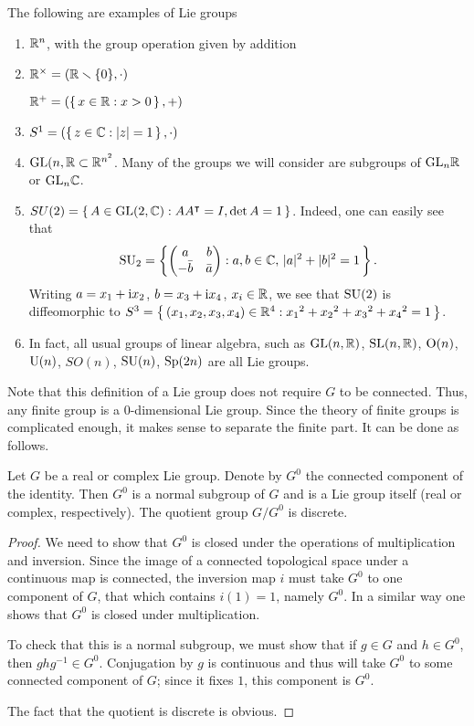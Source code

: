 \begin{example}
  The following are examples of Lie groups
  \begin{enumerate}[label=(\arabic*)]
  \item $\mathbb{R}^n$, with the group operation given by addition
  \item $\mathbb{R}^\times=(\mathbb{R}\smallsetminus\{0\},\cdot)$

    $\mathbb{R}^+=(\left\{\,x\in\mathbb{R}:x>0\,\right\},+)$
  \item $S^1=(\left\{\,z\in\mathbb{C}:|z|=1\,\right\},\cdot)$
  \item $\mathrm{GL}(n,\mathbb{R}\subset\mathbb{R}^{n^2}$. Many of the groups we will consider
    are subgroups of ${\mathrm{GL}_n}\mathbb{R}$ or ${\mathrm{GL}_n}\mathbb{C}$.
  \item $SU(2)=\left\{\,A\in\mathrm{GL}(2,\mathbb{C}):AA^\intercal=I,\det
      A=1\,\right\}$. Indeed, one can easily see that
    \[
      \mathrm{SU}_2=\left\{
        \begin{pmatrix}
          a&b\\
          -\bar b&\bar a
        \end{pmatrix}:
        a,b\in\mathbb{C},\,|a|^2+|b|^2=1\,
      \right\}.
    \]
    Writing $a=x_1+\mathrm{i} x_2$, $b=x_3+\mathrm{i} x_4$, $x_i\in\mathbb{R}$, we see that
    $\mathrm{SU}(2)$ is diffeomorphic to
    $S^3=\left\{\,(x_1,x_2,x_3,x_4)\in\mathbb{R}^4:{x_1}^2+{x_2}^2+{x_3}^2+{x_4}^2=1\,\right\}$.
  \item In fact, all usual groups of linear algebra, such as $\mathrm{GL}(n,\mathbb{R})$,
    $\mathrm{SL}(n,\mathbb{R})$, $\mathrm{O}(n)$, $\mathrm{U}(n)$, $SO(n)$, $\mathrm{SU}(n)$, $\mathrm{Sp}(2n)$ are
    all Lie groups.
  \end{enumerate}
\end{example}

Note that this definition of a Lie group does not require $G$ to be
connected. Thus, any finite group is a $0$-dimensional Lie group. Since the
theory of finite groups is complicated enough, it makes sense to separate
the finite part. It can be done as follows.

\begin{theorem}
  Let $G$ be a real or complex Lie group. Denote by $G^0$ the connected
  component of the identity. Then $G^0$ is a normal subgroup of $G$ and is
  a Lie group itself (real or complex, respectively). The quotient group
  $G/G^0$ is discrete.
\end{theorem}
\begin{proof}
  We need to show that $G^0$ is closed under the operations of
  multiplication and inversion. Since the image of a connected topological
  space under a continuous map is connected, the inversion map $i$ must
  take $G^0$ to one component of $G$, that which contains $i(1)=1$, namely
  $G^0$. In a similar way one shows that $G^0$ is closed under
  multiplication.

  To check that this is a normal subgroup, we must show that if $g\in G$
  and $h\in G^0$, then $ghg^{-1}\in G^0$. Conjugation by $g$ is continuous
  and thus will take $G^0$ to some connected component of $G$; since it
  fixes $1$, this component is $G^0$.

  The fact that the quotient is discrete is obvious.
\end{proof}


